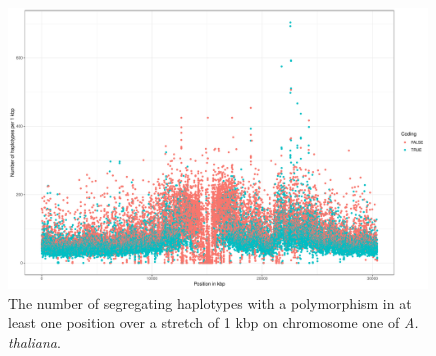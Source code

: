 \begin{figure}[H]
\centering 
\includegraphics[height=.55\textheight, width=0.99\textwidth]{Figures/chr1_hap}
\decoRule
\caption[Haplotype structure of chromosome 1 of \textit{A. thaliana}]{The number of
  segregating haplotypes with a polymorphism in at least one position over a stretch of 1
  kbp on chromosome one of \textit{A. thaliana}.}
\label{fig:chr1}
\end{figure}

